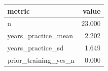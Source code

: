 \begin{tabular}{lr}
\toprule
metric & value \\
\midrule
n & 23.000 \\
years_practice_mean & 2.202 \\
years_practice_sd & 1.649 \\
prior_training_yes_n & 0.000 \\
\bottomrule
\end{tabular}
